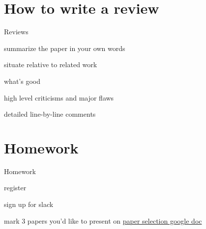 \documentclass[presentation,xcolor={usenames,dvipsnames}]{beamer}
\begin{document}
\section{How to write a review}

\begin{frame}{Reviews}

\bit
\item summarize the paper in your own words
\item situate relative to related work
\item what's good
\item high level criticisms and major flaws
\item detailed line-by-line comments
\eit

\end{frame}

\section{Homework}

\begin{frame}{Homework}

\bit
\item register
\item sign up for slack
\item mark 3 papers you'd like to present on \href{https://docs.google.com/spreadsheets/d/1eSJn0_ANEXfOsZZrYwHoQ6F00FKBLz4olbKVtOLoE40/edit#gid=93392279}{paper selection google doc}
\eit

\end{frame}
\end{document}
